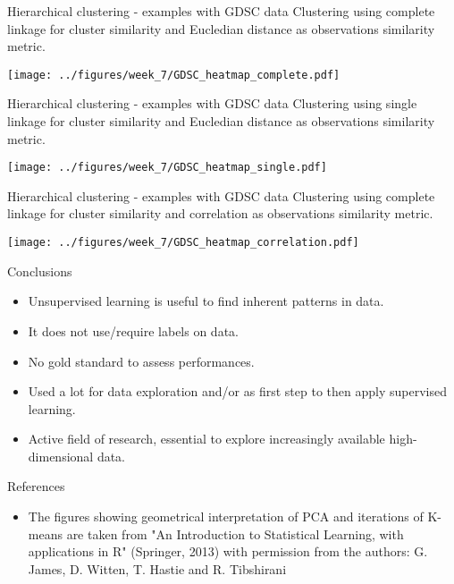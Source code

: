 \documentclass[notes]{beamer}          %
\begin{document}
\begin{frame}{Hierarchical clustering - examples with GDSC data}
Clustering using complete linkage for cluster similarity and Eucledian distance as observations similarity metric.
\begin{center}
\texttt{[image: ../figures/week\_7/GDSC\_heatmap\_complete.pdf]}  
\end{center}
\end{frame}

\begin{frame}{Hierarchical clustering - examples with GDSC data}
Clustering using single linkage for cluster similarity and Eucledian distance as observations similarity metric.\begin{center}
\texttt{[image: ../figures/week\_7/GDSC\_heatmap\_single.pdf]}  
\end{center}
\end{frame}

\begin{frame}{Hierarchical clustering - examples with GDSC data}
Clustering using complete linkage for cluster similarity and correlation as observations similarity metric.
\begin{center}
\texttt{[image: ../figures/week\_7/GDSC\_heatmap\_correlation.pdf]}  
\end{center}
\end{frame}

\begin{frame}{Conclusions}
\begin{itemize}
\item Unsupervised learning is useful to find inherent patterns in data. 
\item It does not use/require labels on data. 
\item No gold standard to assess performances.
\item Used a lot for data exploration and/or as first step to then apply supervised learning.
\item Active field of research, essential to explore increasingly available high-dimensional data.
\end{itemize}
\end{frame}




\begin{frame}{References}
\begin{itemize}
\item The figures showing geometrical interpretation of PCA and iterations of K-means are taken from "An Introduction to Statistical Learning, with applications in R"  (Springer, 2013) with permission from the authors: G. James, D. Witten, T. Hastie and R. Tibshirani 
\end{itemize}
\printbibliography
\end{frame}
\end{document}
